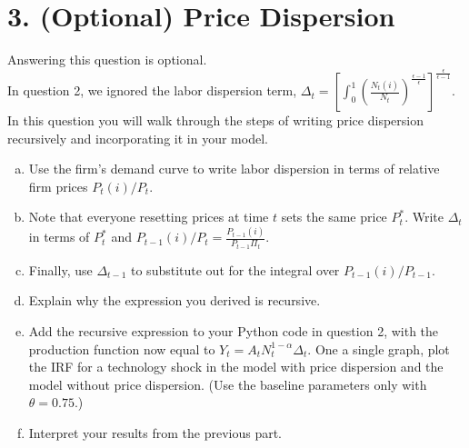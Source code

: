 \documentclass{article}
\newcommand{\1}{\mathbf{1}}
\begin{document}
\section*{3. (Optional) Price Dispersion}
Answering this question is optional.\\
In question 2, we ignored the labor dispersion term, $\Delta_t = \left[\int_0^1 \left(\frac{N_t(i)}{N_t}\right)^{\frac{\epsilon-1}{\epsilon}}\right]^{\frac{\epsilon}{\epsilon-1}}$. In this question you will walk through the steps of writing price dispersion recursively and incorporating it in your model.
\begin{enumerate}[(a)]
	\item Use the firm's demand curve to write labor dispersion in terms of relative firm prices $P_t(i)/P_t$.
	\item Note that everyone resetting prices at time $t$ sets the same price $P_t^*$. Write $\Delta_t $ in terms of $P_t^*$ and $P_{t-1}(i)/P_t = \frac{P_{t-1}(i)}{P_{t-1}\Pi_t}$.
	\item Finally, use $\Delta_{t-1} $ to substitute out for the integral over $P_{t-1}(i)/P_{t-1}$.
	\item Explain why the expression you derived is recursive.
	\item Add the recursive expression to your Python code in question 2, with the production function now equal to $Y_t = A_t N_t^{1-\alpha}\Delta_t $. One a single graph, plot the IRF for a technology shock in the model with price dispersion and the model without price dispersion. (Use the baseline parameters only with $\theta=0.75$.)
	\item Interpret your results from the previous part. 
\end{enumerate}
\end{document}
